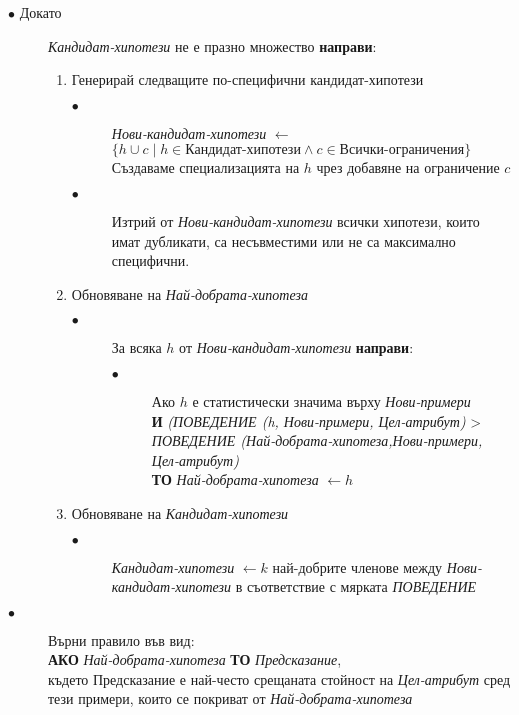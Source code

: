 \documentclass{article}
\begin{document}
\begin{description}
\begin{enumerate}
	\end{enumerate}
	\item [$\bullet$ Докато] \textit{Кандидат-хипотези} не е празно множество \textbf{направи}:
	\begin{enumerate}
		\item Генерирай следващите по-специфични кандидат-хипотези
			\begin{description}
				\item [$\bullet$] \textit{Нови-кандидат-хипотези} $\leftarrow$ $\{h \cup c \mid h \in \textit{Кандидат-хипотези} \land c \in \textit{Всички-ограничения}\}$\\
				Създаваме специализацията на $h$ чрез добавяне на ограничение $c$
				\item [$\bullet$] Изтрий от \textit{Нови-кандидат-хипотези} всички хипотези, които
имат дубликати, са несъвместими или не са максимално
специфични.
			\end{description}
		\item Обновяване на \textit{Най-добрата-хипотеза}
			\begin{description}
				\item [$\bullet$] За всяка $h$ от \textit{Нови-кандидат-хипотези} \textbf{направи}:
				\begin{description}
					\item [$\bullet$]
Ако $h$ е статистически значима върху \textit{Нови-примери}\\
\textbf{И} \textit{(ПОВЕДЕНИЕ (h, Нови-примери, Цел-атрибут)} > \textit{ПОВЕДЕНИЕ (Най-добрата-хипотеза,Нови-примери, Цел-атрибут)}\\
\textbf{ТО} \textit{Най-добрата-хипотеза} $\leftarrow h$
				
				\end{description}
			\end{description}
		\item Обновяване на \textit{Кандидат-хипотези}
			\begin{description}
				\item [$\bullet$] 
\textit{Кандидат-хипотези} $\leftarrow k$ най-добрите членове между \textit{Нови-кандидат-хипотези} в съответствие с мярката \textit{ПОВЕДЕНИЕ}
			\end{description}
	\end{enumerate}
	\item [$\bullet$] Върни правило във вид:\\
	\textbf{АКО} \textit{Най-добрата-хипотеза} \textbf{ТО} \textit{Предсказание},\\
където Предсказание е най-често срещаната стойност на \textit{Цел-атрибут}
сред тези примери, които се покриват от \textit{Най-добрата-хипотеза}
\end{description}
\end{document}
